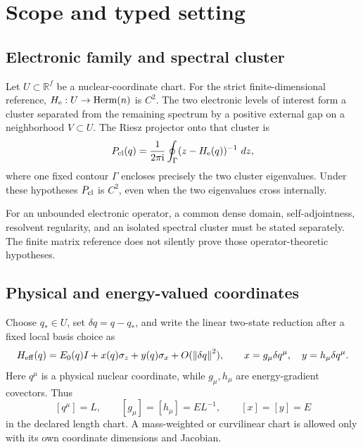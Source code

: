\documentclass[11pt,a4paper]{article}
\theoremstyle{definition}
\theoremstyle{plain}
\theoremstyle{remark}
\newcommand{\R}{\mathbb{R}}
\newcommand{\dd}{\mathop{}\!d}
\newcommand{\norm}[1]{\left\lVert #1\right\rVert}
\newcommand{\I}{\mathrm i}
\begin{document}
\tableofcontents

\section{Scope and typed setting}

\subsection{Electronic family and spectral cluster}

Let \(U\subset\R^f\) be a nuclear-coordinate chart.  For the strict
finite-dimensional reference, \(H_{\rm e}:U\to\operatorname{Herm}(n)\)
is \(C^2\).  The two electronic levels of interest form a cluster
separated from the remaining spectrum by a positive external gap on a
neighborhood \(V\subset U\).  The Riesz projector onto that cluster is
\begin{equation}\label{eq:cluster-projector}
P_{\rm cl}(q)=\frac{1}{2\pi\I}\oint_\Gamma
(z-H_{\rm e}(q))^{-1}\,\dd z,
\end{equation}
where one fixed contour \(\Gamma\) encloses precisely the two cluster
eigenvalues.  Under these hypotheses \(P_{\rm cl}\) is \(C^2\), even
when the two eigenvalues cross internally.

For an unbounded electronic operator, a common dense domain,
self-adjointness, resolvent regularity, and an isolated spectral
cluster must be stated separately.  The finite matrix reference does
not silently prove those operator-theoretic hypotheses.

\subsection{Physical and energy-valued coordinates}

Choose \(q_\ast\in U\), set \(\delta q=q-q_\ast\), and write the
linear two-state reduction after a fixed local basis choice as
\begin{equation}\label{eq:linear-normal-form}
H_{\rm eff}(q)
=E_0(q)I+x(q)\sigma_z+y(q)\sigma_x+O(\norm{\delta q}^2),
\qquad
x=g_\mu\delta q^\mu,\quad y=h_\mu\delta q^\mu.
\end{equation}
Here \(q^\mu\) is a physical nuclear coordinate, while
\(g_\mu,h_\mu\) are energy-gradient covectors. Thus
\[
[q^\mu]=L,\qquad [g_\mu]=[h_\mu]=EL^{-1},\qquad [x]=[y]=E
\]
in the declared length chart. A mass-weighted or curvilinear chart is
allowed only with its own coordinate dimensions and Jacobian.
\end{document}

